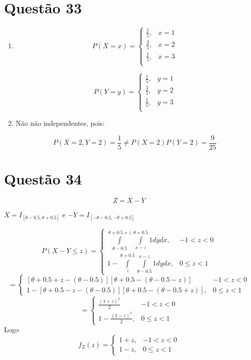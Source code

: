 \documentclass[a4paper,12pt]{report}
\begin{document}
				\section*{Questão 33}
									\begin{enumerate}[label=\alph*)]
										\item															
				$$ 
			P(X=x)=\begin{cases}
					\frac{1}{5}, & x=1 \\
					\frac{3}{5}, & x=2 \\
					\frac{1}{5}, & x=3\\
																																												
\end{cases}
						$$
						
										$$ 
						P(Y=y)=\begin{cases}
						\frac{1}{5}, & y=1 \\
						\frac{3}{5}, & y=2 \\
						\frac{1}{5}, & y=3\\
						\end{cases}
						$$
						\item
						Não não independentes, pois:
						
						$$P(X=2,Y=2)=\frac{1}{5} \ne P(X=2)P(Y=2)= \frac{9}{25} $$
						
						
							\end{enumerate}
						
						\newpage 
						
							\section*{Questão 34}
							
							$$Z=X-Y $$
							
							$X=I_{[\theta - 0.5,\theta+0.5]}$ e $-Y= I_{[-\theta - 0.5,-\theta+0.5]}$
							
							 $$P(X-Y\le z) = \begin{cases}
							 \int\limits_{\theta - 0.5}^{\theta+0.5+z} \int\limits_{x-z}^{\theta+0.5}1dydx, & -1 < z < 0\\
							 1 - \int\limits_{z}^{\theta+0.5}\int\limits_{\theta-0.5}^{x-z}1dydx, & 0\le z< 1
							 \end{cases} 
							 $$
							 $$
							 =
							 \begin{cases}
							 [\theta + 0.5+z-(\theta-0.5)][\theta+0.5-(\theta-0.5-z)] & -1 < z < 0\\
							 	 1 -[\theta+0.5-z-(\theta-0.5)][\theta+0.5-(\theta-0.5+z)], & 0\le z< 1
							 \end{cases}
							 $$
							 	 $$
							 =
							 \begin{cases}
							 \frac{(1+z)^2}{2} & -1 < z < 0\\
						1-\frac{(1-z)^2}{2}, & 0\le z< 1
							 \end{cases}
							 $$
Logo
$$ 
f_Z(z)=\begin{cases}
						1+z,& -1 < z < 0\\
1-z, & 0\le z< 1
\end{cases}
$$
\end{document}
